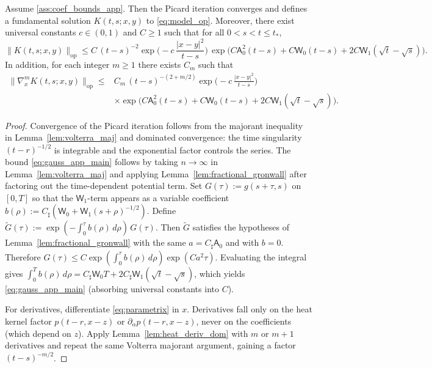 \begin{theorem}\label{thm:gauss_cont_proved}
Assume \ref{ass:coef_bounds_app}. Then the Picard iteration converges and defines a fundamental solution $K(t,s;x,y)$ to \eqref{eq:model_op}.
Moreover, there exist universal constants $c\in(0,1)$ and $C\ge 1$ such that for all $0<s<t\le t_\ast$,
\begin{equation}\label{eq:gauss_app_main}
\|K(t,s;x,y)\|_{\mathrm{op}}
\le
C\,(t-s)^{-2}\exp\!\Big(-c\,\frac{|x-y|^2}{t-s}\Big)\,
\exp\!\Big(C\mathsf A_0^2(t-s)+C\mathsf W_0(t-s)+2C\mathsf W_1(\sqrt t-\sqrt s)\Big).
\end{equation}
In addition, for each integer $m\ge 1$ there exists $C_m$ such that
\begin{equation}\label{eq:gauss_app_der}
\begin{aligned}
\|\nabla_x^m K(t,s;x,y)\|_{\mathrm{op}}
\le{}&C_m\,(t-s)^{-(2+m/2)}
\exp\!\Big(-c\,\frac{|x-y|^2}{t-s}\Big)\\
&\times\exp\!\Big(C\mathsf A_0^2(t-s)+C\mathsf W_0(t-s)
+2C\mathsf W_1(\sqrt t-\sqrt s)\Big).
\end{aligned}
\end{equation}
\end{theorem}

\begin{proof}
Convergence of the Picard iteration follows from the majorant inequality in Lemma~\ref{lem:volterra_maj} and dominated convergence:
the time singularity $(t-r)^{-1/2}$ is integrable and the exponential factor controls the series.
The bound \eqref{eq:gauss_app_main} follows by taking $n\to\infty$ in Lemma~\ref{lem:volterra_maj} and applying Lemma~\ref{lem:fractional_gronwall}
after factoring out the time-dependent potential term.
Set $G(\tau):=g(s+\tau,s)$ on $[0,T]$ so that the $\mathsf W_1$-term appears as a variable coefficient
$b(\rho):=C_\sharp(\mathsf W_0+\mathsf W_1(s+\rho)^{-1/2})$.
Define $\widetilde G(\tau):=\exp(-\int_0^{\tau} b(\rho)\,d\rho)\,G(\tau)$.
Then $\widetilde G$ satisfies the hypotheses of Lemma~\ref{lem:fractional_gronwall} with the same
$a=C_\sharp\mathsf A_0$ and with $b=0$.
Therefore $G(\tau)\le C\exp(\int_0^{\tau} b(\rho)\,d\rho)\exp(Ca^2\tau)$.
Evaluating the integral gives
$\int_0^{T} b(\rho)\,d\rho = C_\sharp\mathsf W_0 T + 2C_\sharp\mathsf W_1(\sqrt t-\sqrt s)$,
which yields \eqref{eq:gauss_app_main} (absorbing universal constants into $C$).

For derivatives, differentiate \eqref{eq:parametrix} in $x$.
Derivatives fall only on the heat kernel factor $p(t-r,x-z)$ or $\partial_\alpha p(t-r,x-z)$, never on the coefficients (which depend on $z$).
Apply Lemma~\ref{lem:heat_deriv_dom} with $m$ or $m+1$ derivatives and repeat the same Volterra majorant argument, gaining a factor $(t-s)^{-m/2}$.
\end{proof}

